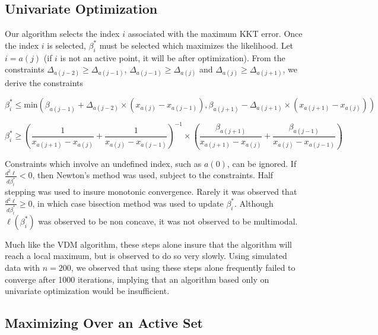\documentclass[12pt]{article}
\numberwithin{equation}{section}
\begin{document}
	{\subsection{Univariate Optimization}} 
	
	Our algorithm selects the index $i$ associated with the maximum KKT error. Once the index $i$ is selected, $\beta_i^*$ must be selected which maximizes the likelihood. Let $i = a(j)$ (if $i$ is not an active point, it will be after optimization). From the constraints $\Delta_{a(j-2)} \geq \Delta_{a(j-1)}$, $\Delta_{a(j-1)} \geq \Delta_{a(j)}$ and $\Delta_{a(j)} \geq \Delta_{a(j+1)}$, we derive the constraints
	
	\[ \beta_i^* \leq \text{min}\left(\beta_{a(j-1)} + \Delta_{a(j-2)} \times (x_{a(j)} - x_{a(j-1)}), \beta_{a(j+1)} -\Delta_{a(j+1)} \times (x_{a(j+1)} - x_{a(j)}) \right) 
	\]
	
	\[ \beta_i^* \geq \left(\frac{1}{x_{a(j+1)} - x_{a(j)}} +  \frac{1}{x_{a(j)} - x_{a(j-1)} } \right)^{-1} \times \left(\frac{\beta_{a(j+1)} } { x_{a(j+1)} - x_{a(j)}} + \frac{\beta_{a(j-1)}} {x_{a(j)} - x_{a(j-1)} } \right)
	\]
	
	Constraints which involve an undefined index, such as $a(0)$, can be ignored. If $\frac{d^2 \ell} {d \beta^*_{i} } < 0$, then Newton's method was used, subject to the constraints. Half stepping was used to insure monotonic convergence. Rarely it was observed that $\frac{d^2 \ell} {d \beta^*_{i} } \geq 0$, in which case bisection method was used to update $\beta^*_i$. Although $\ell(\beta^*_i)$ was observed to be non concave, it was not observed to be multimodal.
	
	Much like the VDM algorithm, these steps alone insure that the algorithm will reach a local maximum, but is observed to do so very slowly. Using simulated data with $n = 200$, we observed that using these steps alone frequently failed to converge after 1000 iterations, implying that an algorithm based only on univariate optimization would be insufficient. 
	
	{\subsection{Maximizing Over an Active Set} }
	
\end{document}
